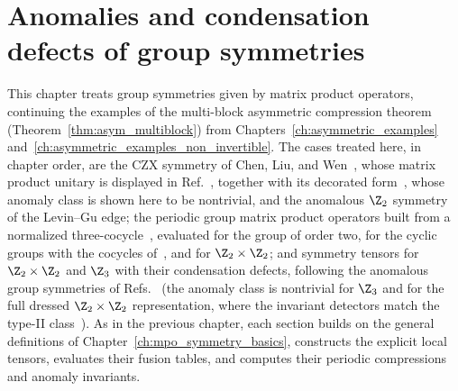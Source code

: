 
\chapter{Anomalies and condensation defects of group symmetries}%
\label{ch:asymmetric_examples_group_symmetries}

This chapter treats group symmetries given by matrix product operators,
continuing the examples of the multi-block asymmetric compression theorem
(Theorem~\ref{thm:asym_multiblock}) from
Chapters~\ref{ch:asymmetric_examples}
and~\ref{ch:asymmetric_examples_non_invertible}. The cases treated here, in
chapter order, are the CZX symmetry of Chen, Liu, and
Wen~\cite{ChenLiuWen2011CZX}, whose matrix product unitary is displayed in
Ref.~\cite[Appendix~A, ``The CZX MPU'']{Cirac2021Matrix}, together with its
decorated form~\cite{GarreRubioSchuch2024DomainWall}, whose anomaly class is
shown here to be nontrivial, and the anomalous $\Z_2$ symmetry of the
Levin--Gu edge;
the periodic group matrix product operators built from a normalized
three-cocycle~\cite{GarreRubio2023MPOSym}, evaluated for the group of order
two, for the cyclic groups with the cocycles
of~\cite{GarreRubioSchuch2024DomainWall}, and for $\Z_2\times\Z_2$;
and symmetry tensors for $\Z_2\times\Z_2$ and $\Z_3$ with their condensation
defects, following the anomalous group symmetries of
Refs.~\cite{GarreRubio2023MPOSym,GarreRubioSchuch2024DomainWall,Roumpedakis2023Condensation}
(the anomaly class is nontrivial for $\Z_3$ and for the full dressed
$\Z_2\times\Z_2$ representation, where the invariant detectors match the
type-II class~\cite{gap:glm23_z2z2_anomaly_detector_scope}). As in the
previous chapter, each section builds on the general definitions of
Chapter~\ref{ch:mpo_symmetry_basics}, constructs the explicit local tensors,
evaluates their fusion tables, and computes their periodic compressions and
anomaly invariants.

%
%
%
%
%
%
